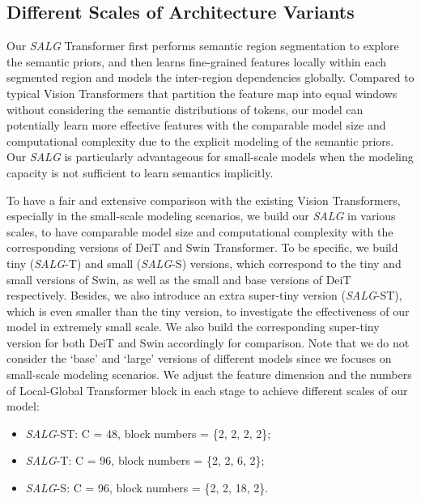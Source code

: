 \subsection{Different Scales of Architecture Variants}
\label{sec:3.4}
Our \emph{SALG} Transformer first performs semantic region segmentation to explore the semantic priors, and then learns fine-grained features locally within each segmented region and models the inter-region dependencies globally. Compared to typical Vision Transformers that partition the feature map into equal windows without considering the semantic distributions of tokens, our model can potentially learn more effective features with the comparable model size and computational complexity due to the explicit modeling of the semantic priors. Our \emph{SALG} is particularly advantageous for small-scale models when the modeling capacity is not sufficient to learn semantics implicitly. 

To have a fair and extensive comparison with the existing Vision Transformers, especially in the small-scale modeling scenarios, we build our \emph{SALG} in various scales, to have comparable model size and computational complexity with the corresponding versions of DeiT and Swin Transformer. To be specific, we build tiny (\emph{SALG}-T) and small (\emph{SALG}-S) versions, which correspond to the tiny and small versions of Swin, as well as the small and base versions of DeiT respectively. Besides, we also introduce an extra super-tiny version (\emph{SALG}-ST), which is even smaller than the tiny version, to investigate the effectiveness of our model in extremely small scale. We also build the corresponding super-tiny version for both DeiT and Swin accordingly for comparison. Note that we do not consider the `base' and `large' versions of different models since we focuses on small-scale modeling scenarios. We adjust the feature dimension  and the numbers of Local-Global Transformer block in each stage to achieve different scales of our model:
\begin{itemize}
    \item \emph{SALG}-ST: C = 48, block numbers = \{2, 2, 2, 2\};
    \item \emph{SALG}-T: C = 96, block numbers = \{2, 2, 6, 2\};
    \item \emph{SALG}-S: C = 96, block numbers = \{2, 2, 18, 2\}.
\end{itemize}

